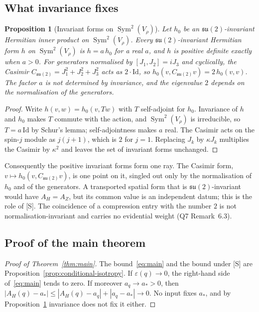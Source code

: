 \documentclass[12pt,a4paper]{article}
\newtheorem{proposition}[theorem]{Proposition}
\theoremstyle{definition}
\theoremstyle{remark}
\DeclareMathOperator{\Sym}{Sym}
\newcommand{\Csu}{C_{\mathfrak{su}(2)}}
\begin{document}
    \subsection{What invariance fixes}

      \begin{proposition}[Invariant forms on $\Sym^2(V_\rho)$]\label{prop:casimir-unique}
        Let $h_0$ be an $\mathfrak{su}(2)$-invariant Hermitian inner product on $\Sym^2(V_\rho)$.
        Every $\mathfrak{su}(2)$-invariant Hermitian form $h$ on $\Sym^2(V_\rho)$ is $h = a\,h_0$ for a real $a$, and
        $h$ is positive definite exactly when $a > 0$.
        For generators normalised by $[J_1, J_2] = i J_3$ and cyclically, the Casimir
        $\Csu = J_1^2 + J_2^2 + J_3^2$ acts as $2 \cdot \mathrm{Id}$, so $h_0(v, \Csu v) = 2\,h_0(v, v)$.
        The factor $a$ is not determined by invariance, and the eigenvalue $2$ depends on the normalisation of the
        generators.
      \end{proposition}

      \begin{proof}
        Write $h(v, w) = h_0(v, Tw)$ with $T$ self-adjoint for $h_0$.
        Invariance of $h$ and $h_0$ makes $T$ commute with the action, and $\Sym^2(V_\rho)$ is irreducible, so
        $T = a\,\mathrm{Id}$ by Schur's lemma; self-adjointness makes $a$ real.
        The Casimir acts on the spin-$j$ module as $j(j+1)$, which is $2$ for $j = 1$.
        Replacing $J_k$ by $\kappa J_k$ multiplies the Casimir by $\kappa^2$ and leaves the set of invariant forms
        unchanged.
      \end{proof}

      Consequently the positive invariant forms form one ray.
      The Casimir form, $v \mapsto h_0(v, \Csu v)$, is one point on it, singled out only by the normalisation of
      $h_0$ and of the generators.
      A transported spatial form that is $\mathfrak{su}(2)$-invariant would have $A_H = A_Z$, but its common value is
      an independent datum; this is the role of [S].
      The coincidence of a compression entry with the number $2$ is not normalisation-invariant and carries no
      evidential weight (Q7 Remark~6.3).

    \subsection{Proof of the main theorem}

      \begin{proof}[Proof of Theorem~\ref{thm:main}]
        The bound~\eqref{eq:main} and the bound under [S] are Proposition~\ref{prop:conditional-isotropy}.
        If $\varepsilon(q) \to 0$, the right-hand side of~\eqref{eq:main} tends to zero.
        If moreover $a_q \to a_* > 0$, then
        $|A_H(q) - a_*| \leq |A_H(q) - a_q| + |a_q - a_*| \to 0$.
        No input fixes $a_*$, and by Proposition~\ref{prop:casimir-unique} invariance does not fix it either.
      \end{proof}
\end{document}
